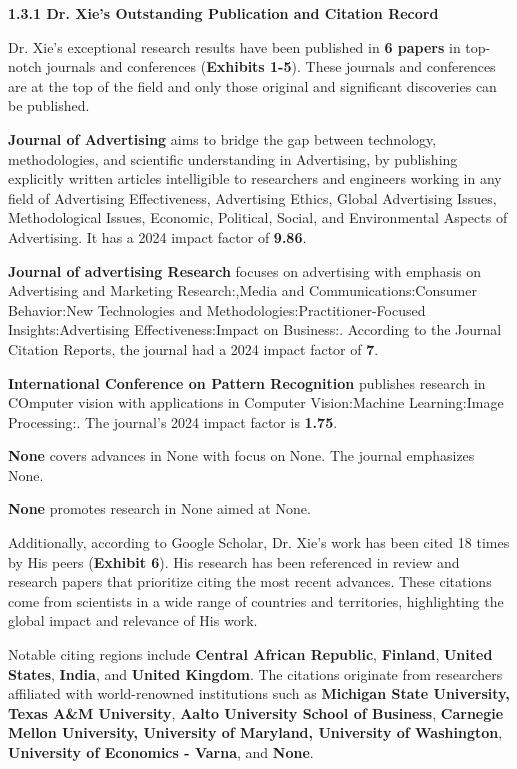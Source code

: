 \documentclass{article}
\begin{document}
{\bf 1.3.1 Dr. Xie's Outstanding Publication and Citation Record}

Dr. Xie's exceptional research results have been published in \textbf{6 papers} in top-notch journals and conferences (\textbf{Exhibits 1-5}). These journals and conferences are at the top of the field and only those original and significant discoveries can be published.

\textbf{Journal of Advertising} aims to bridge the gap between technology, methodologies, and scientific understanding in Advertising, by publishing explicitly written articles intelligible to researchers and engineers working in any field of Advertising Effectiveness, Advertising Ethics, Global Advertising Issues, Methodological Issues, Economic, Political, Social, and Environmental Aspects of Advertising. It has a 2024 impact factor of \textbf{9.86}.

\textbf{Journal of advertising Research} focuses on advertising with emphasis on Advertising and Marketing Research:,Media and Communications:Consumer Behavior:New Technologies and Methodologies:Practitioner-Focused Insights:Advertising Effectiveness:Impact on Business:. According to the Journal Citation Reports, the journal had a 2024 impact factor of \textbf{7}.

\textbf{International Conference on Pattern Recognition} publishes research in COmputer vision with applications in Computer Vision:Machine Learning:Image Processing:. The journal's 2024 impact factor is \textbf{1.75}.

\textbf{None} covers advances in None with focus on None. The journal emphasizes None.

\textbf{None} promotes research in None aimed at None.

Additionally, according to Google Scholar, Dr. Xie's work has been cited 18 times by His peers (\textbf{Exhibit 6}). His research has been referenced in review and research papers that prioritize citing the most recent advances. These citations come from scientists in a wide range of countries and territories, highlighting the global impact and relevance of His work.

Notable citing regions include \textbf{Central African Republic}, \textbf{Finland}, \textbf{United States}, \textbf{India}, and \textbf{United Kingdom}. The citations originate from researchers affiliated with world-renowned institutions such as \textbf{Michigan State University, Texas A\&M University}, \textbf{Aalto University School of Business}, \textbf{Carnegie Mellon University, University of Maryland, University of Washington}, \textbf{University of Economics - Varna}, and \textbf{None}.
\end{document}
